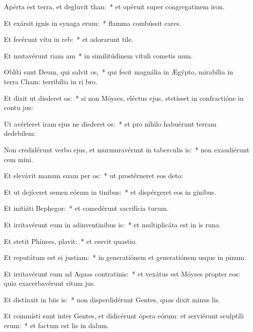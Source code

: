 \item Apérta est terra, et degluvit than:~* et opéruit super congregatinem iron.
\item Et exársit ignis in synaga erum:~* flamma combússit cares.
\item Et fecérunt vítu in reb:~* et adorarunt tile.
\item Et mutavérunt riam am~* in similitúdinem vítuli cometis num.
\item Oblíti sunt Deum, qui salvit os,~* qui fecit magnália in Ægýpto, mirabília in terra Cham: terribília in ri bro.
\item Et dixit ut disderet os:~* si non Móyses, eléctus ejus, stetísset in confractióne in contu jus:
\item Ut avérteret iram ejus ne disderet os:~* et pro níhilo habuérunt terram dedebilem:
\item Non credidérunt verbo ejus, et murmuravérunt in taberculis is:~* non exaudiérunt cem mini.
\item Et elevávit manum suam per os:~* ut prostérneret eos  deto:
\item Et ut dejíceret semen eórum in tinibus:~* et dispérgeret eos in ginibus.
\item Et initiáti  Bephegor:~* et comedérunt sacrifícia turum.
\item Et irritavérunt eum in adinventinibus is:~* et multiplicáta est in is runa.
\item Et stetit Phínees,  plavit:~* et cesvit quastio.
\item Et reputátum est ei  justiam:~* in generatiónem et generatiónem usque in pinum.
\item Et irritavérunt eum ad Aquas contratinis:~* et vexátus est Móyses propter eos: quia exacerbavérunt ritum jus.
\item Et distínxit in biis is:~* non disperdidérunt Gentes, quas dixit minus lis.
\item Et commísti sunt inter Gentes, et didicérunt ópera eórum: et serviérunt sculptíli erum:~* et factum est lis in dalum.
